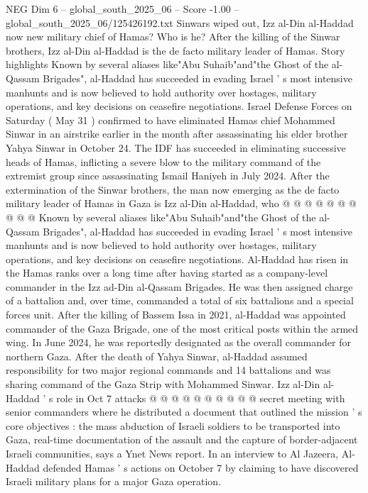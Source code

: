 \begin{textsample}{NEG Dim 6 – global\_south\_2025\_06 – Score -1.00 – global\_south\_2025\_06/125426192.txt}  \label{ex:f6_neg_440}
Sinwars wiped out, Izz al-Din al-Haddad now new military chief of Hamas?
Who is he?
After the killing of the Sinwar brothers, Izz al-Din al-Haddad is the de facto military leader of Hamas.
Story highlights Known by several aliases like"Abu Suhaib"and"the Ghost of the al-Qassam Brigades", al-Haddad has succeeded in evading Israel ' s most intensive manhunts and is now believed to hold authority over hostages, military operations, and key decisions on ceasefire negotiations.
Israel Defense Forces on Saturday ( May 31 ) confirmed to have eliminated Hamas chief Mohammed Sinwar in an airstrike earlier in the month after assassinating his elder brother Yahya Sinwar in October 24.
The IDF has succeeded in eliminating successive heads of Hamas, inflicting a severe blow to the military command of the extremist group since assassinating Ismail Haniyeh in July 2024.
After the extermination of the Sinwar brothers, the man now emerging as the de facto military leader of Hamas in Gaza is Izz al-Din al-Haddad, who @ @ @ @ @ @ @ @ @ @ Known by several aliases like"Abu Suhaib"and"the Ghost of the al-Qassam Brigades", al-Haddad has succeeded in evading Israel ' s most intensive manhunts and is now believed to hold authority over hostages, military operations, and key decisions on ceasefire negotiations.
Al-Haddad has risen in the Hamas ranks over a long time after having started as a company-level commander in the Izz ad-Din al-Qassam Brigades.
He was then assigned charge of a battalion and, over time, commanded a total of six battalions and a special forces unit.
After the killing of Bassem Issa in 2021, al-Haddad was appointed commander of the Gaza Brigade, one of the most critical posts within the armed wing.
In June 2024, he was reportedly designated as the overall commander for northern Gaza.
After the death of Yahya Sinwar, al-Haddad assumed responsibility for two major regional commands and 14 battalions and was sharing command of the Gaza Strip with Mohammed Sinwar.
Izz al-Din al-Haddad ' s role in Oct 7 attacks @ @ @ @ @ @ @ @ @ @ secret meeting with senior commanders where he distributed a document that outlined the mission ' s core objectives : the mass abduction of Israeli soldiers to be transported into Gaza, real-time documentation of the assault and the capture of border-adjacent Israeli communities, says a Ynet News report.
In an interview to Al Jazeera, Al-Haddad defended Hamas ' s actions on October 7 by claiming to have discovered Israeli military plans for a major Gaza operation.

\end{textsample}
